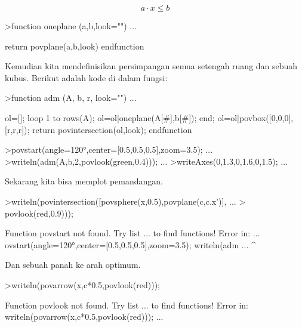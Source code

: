 \documentclass[a4paper,10pt]{article}
\begin{document}
\begin{eulernotebook}
\begin{eulercomment}
\begin{eulercomment}
\begin{eulercomment}
\end{eulercomment}
\begin{eulerformula}
\[
a \cdot x \le b
\]
\end{eulerformula}
\begin{eulerprompt}
>function oneplane (a,b,look="") ...
\end{eulerprompt}
\begin{eulerudf}
    return povplane(a,b,look)
  endfunction
\end{eulerudf}
\begin{eulercomment}
Kemudian kita mendefinisikan persimpangan semua setengah ruang dan
sebuah kubus. Berikut adalah kode di dalam fungsi:
\end{eulercomment}
\begin{eulerprompt}
>function adm (A, b, r, look="") ...
\end{eulerprompt}
\begin{eulerudf}
    ol=[];
    loop 1 to rows(A); ol=ol|oneplane(A[#],b[#]); end;
    ol=ol|povbox([0,0,0],[r,r,r]);
    return povintersection(ol,look);
  endfunction
\end{eulerudf}
\begin{eulerprompt}
>povstart(angle=120°,center=[0.5,0.5,0.5],zoom=3.5); ...
>writeln(adm(A,b,2,povlook(green,0.4))); ...
>writeAxes(0,1.3,0,1.6,0,1.5); ...
\end{eulerprompt}
\begin{eulercomment}
Sekarang kita bisa memplot pemandangan.
\end{eulercomment}
\begin{eulerprompt}
>writeln(povintersection([povsphere(x,0.5),povplane(c,c.x')], ...
>  povlook(red,0.9)));
\end{eulerprompt}
\begin{euleroutput}
  Function povstart not found.
  Try list ... to find functions!
  Error in:
  ... ovstart(angle=120°,center=[0.5,0.5,0.5],zoom=3.5); writeln(adm ...
                                                       ^
\end{euleroutput}
\begin{eulercomment}
Dan sebuah panah ke arah optimum.
\end{eulercomment}
\begin{eulerprompt}
>writeln(povarrow(x,c*0.5,povlook(red)));
\end{eulerprompt}
\begin{euleroutput}
  Function povlook not found.
  Try list ... to find functions!
  Error in:
  writeln(povarrow(x,c*0.5,povlook(red))); ...

\end{euleroutput}
\end{eulercomment}
\end{eulercomment}
\end{eulernotebook}
\end{document}
